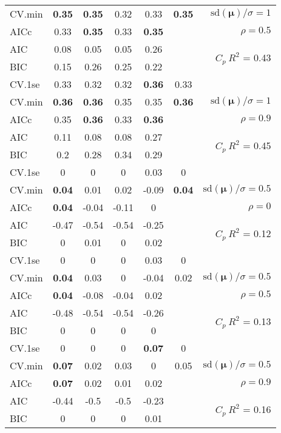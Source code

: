 \documentclass[12pt]{article}
\newcommand{\mr}[1]{\mathrm{#1}}
\newcommand{\bm}[1]{\mathbf{#1}}
\begin{document}
\begin{table}[p]
\begin{center}
\begin{tabular}{l*{5}{c}|r}
CV.min & {\bf 0.35} & {\bf 0.35} & 0.32 & 0.33 & {\bf 0.35} &  $\mr{sd}(\bm{\mu})/\sigma=1$ \\
AICc & 0.33 & {\bf 0.35} & 0.33 & {\bf 0.35} & & $\rho=0.5$ \\
AIC & 0.08 & 0.05 & 0.05 & 0.26 & & \multirow{2}{*}{$C_p ~ R^2$ = 0.43} \\
BIC & 0.15 & 0.26 & 0.25 & 0.22 & & \\
 \hline 
CV.1se & 0.33 & 0.32 & 0.32 & {\bf 0.36} & 0.33 &\\
CV.min & {\bf 0.36} & {\bf 0.36} & 0.35 & 0.35 & {\bf 0.36} &  $\mr{sd}(\bm{\mu})/\sigma=1$ \\
AICc & 0.35 & {\bf 0.36} & 0.33 & {\bf 0.36} & & $\rho=0.9$ \\
AIC & 0.11 & 0.08 & 0.08 & 0.27 & & \multirow{2}{*}{$C_p ~ R^2$ = 0.45} \\
BIC & 0.2 & 0.28 & 0.34 & 0.29 & & \\
 \hline 
CV.1se & 0 & 0 & 0 & 0.03 & 0 &\\
CV.min & {\bf 0.04} & 0.01 & 0.02 & -0.09 & {\bf 0.04} &  $\mr{sd}(\bm{\mu})/\sigma=0.5$ \\
AICc & {\bf 0.04} & -0.04 & -0.11 & 0 & & $\rho=0$ \\
AIC & -0.47 & -0.54 & -0.54 & -0.25 & & \multirow{2}{*}{$C_p ~ R^2$ = 0.12} \\
BIC & 0 & 0.01 & 0 & 0.02 & & \\
 \hline 
CV.1se & 0 & 0 & 0 & 0.03 & 0 &\\
CV.min & {\bf 0.04} & 0.03 & 0 & -0.04 & 0.02 &  $\mr{sd}(\bm{\mu})/\sigma=0.5$ \\
AICc & {\bf 0.04} & -0.08 & -0.04 & 0.02 & & $\rho=0.5$ \\
AIC & -0.48 & -0.54 & -0.54 & -0.26 & & \multirow{2}{*}{$C_p ~ R^2$ = 0.13} \\
BIC & 0 & 0 & 0 & 0 & & \\
 \hline 
CV.1se & 0 & 0 & 0 & {\bf 0.07} & 0 &\\
CV.min & {\bf 0.07} & 0.02 & 0.03 & 0 & 0.05 &  $\mr{sd}(\bm{\mu})/\sigma=0.5$ \\
AICc & {\bf 0.07} & 0.02 & 0.01 & 0.02 & & $\rho=0.9$ \\
AIC & -0.44 & -0.5 & -0.5 & -0.23 & & \multirow{2}{*}{$C_p ~ R^2$ = 0.16} \\
BIC & 0 & 0 & 0 & 0.01 & & \\
 \hline 
\end{tabular}
\end{center}
\vspace{-1cm}
\end{table}
\end{document}
